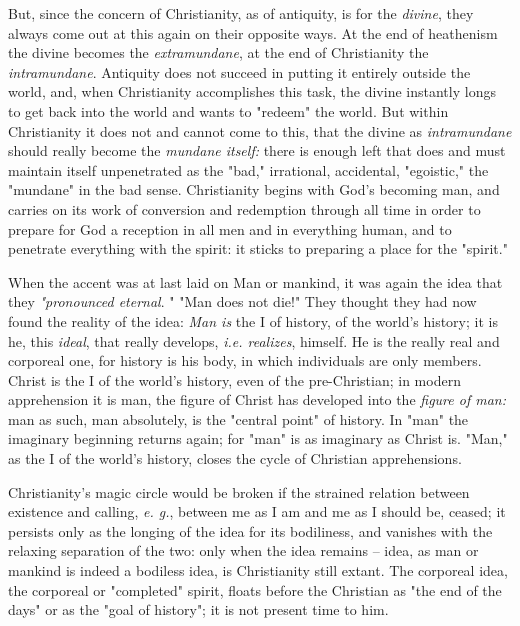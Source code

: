 But, since the concern of Christianity, as of antiquity, is for the 
\textit{divine}, they always come out at this again on their opposite ways. At 
the end of heathenism the divine becomes the \textit{extramundane}, at the end 
of Christianity the \textit{intramundane}. Antiquity does not succeed in 
putting it entirely outside the world, and, when Christianity accomplishes 
this task, the divine instantly longs to get back into the world and wants to 
"{}redeem"{} the world. But within Christianity it does not and cannot come to 
this, that the divine as \textit{intramundane} should really become the 
\textit{mundane itself:} there is enough left that does and must maintain 
itself unpenetrated as the "{}bad,"{} irrational, accidental, "{}egoistic,"{} 
the "{}mundane"{} in the bad sense. Christianity begins with God's becoming 
man, and carries on its work of conversion and redemption through all time in 
order to prepare for God a reception in all men and in everything human, and 
to penetrate everything with the spirit: it sticks to preparing a place for 
the "{}spirit."{}

When the accent was at last laid on Man or mankind, it was again the idea that 
they \textit{"{}pronounced eternal}. "{} "{}Man does not die!"{} They thought 
they had now found the reality of the idea: \textit{Man is} the I of history, 
of the world's history; it is he, this \textit{ideal}, that really develops, 
\textit{i.e. realizes}, himself. He is the really real and corporeal one, for 
history is his body, in which individuals are only members. Christ is the I of 
the world's history, even of the pre-Christian; in modern apprehension it is 
man, the figure of Christ has developed into the \textit{figure of man:} man 
as such, man absolutely, is the "{}central point"{} of history. In "{}man"{} 
the imaginary beginning returns again; for "{}man"{} is as imaginary as Christ 
is. "{}Man,"{} as the I of the world's history, closes the cycle of Christian 
apprehensions.

Christianity's magic circle would be broken if the strained relation between 
existence and calling, \textit{e. g.}, between me as I am and me as I should 
be, ceased; it persists only as the longing of the idea for its bodiliness, 
and vanishes with the relaxing separation of the two: only when the idea 
remains -- idea, as man or mankind is indeed a bodiless idea, is Christianity 
still extant. The corporeal idea, the corporeal or "{}completed"{} spirit, 
floats before the Christian as "{}the end of the days"{} or as the "{}goal of 
history"{}; it is not present time to him.

